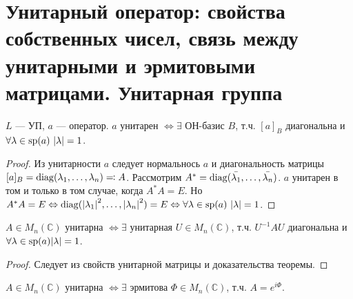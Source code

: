 \section{Унитарный оператор: свойства собственных чисел, связь между унитарными и эрмитовыми матрицами. Унитарная группа}

\begin{thm*}
    $L$ --- УП, $a$ --- оператор. $a$ унитарен $\Leftrightarrow \exists$ ОН-базис $B$, т.ч. $[a]_B$ диагональна и $\forall \lambda \in \spec(a)\ |\lambda| = 1$.
\end{thm*}

\begin{proof}
    Из унитарности $a$ следует нормальнось $a$ и диагональность матрицы $[a]_B = \operatorname{diag}(\lambda_1, \dots, \lambda_n) \eqqcolon A$. Рассмотрим $A^* = \operatorname{diag}(\bar{\lambda_1}, \dots, \bar{\lambda_n})$. $a$ унитарен в том и только в том случае, когда $A^*A = E$. Но $A^*A = E \Leftrightarrow \operatorname{diag}({|\lambda_1|}^2, \dots, {|\lambda_n|}^2) = E \Leftrightarrow \forall \lambda \in \operatorname{sp}(a)\ |\lambda| = 1$.
\end{proof}

\begin{cor}
    $A \in M_n(\mathbb{C})$ унитарна $\Leftrightarrow \exists$ унитарная $U \in M_n(\mathbb{C})$, т.ч. $U^{-1} AU$ диагональна и $\forall \lambda \in \operatorname{sp}(a) |\lambda| = 1$.
\end{cor}

\begin{proof}
    Следует из свойств унитарной матрицы и доказательства теоремы.
\end{proof}

\begin{cor}
    $A \in M_n(\mathbb{C})$ унитарна $\Leftrightarrow \exists$ эрмитова $\Phi \in M_n(\mathbb{C})$, т.ч. $A = e^{i\Phi}$.
\end{cor}

